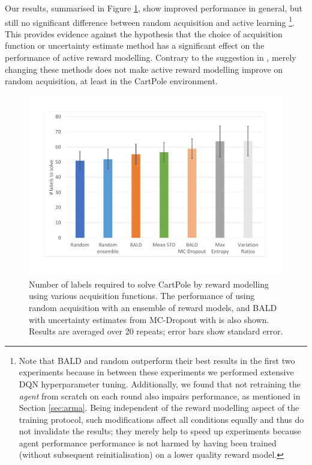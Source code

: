 \documentclass[11pt, a4paper, bibliography=totoc]{report}
\begin{document}
Our results, summarised in Figure \ref{fig:cartpole_final}, show improved performance in general, but still no significant difference between random acquisition and active learning
\footnote{Note that BALD and random outperform their best results in the first two experiments because in between these experiments we performed extensive DQN hyperparameter tuning. Additionally, we found that not retraining the \textit{agent} from scratch on each round also impairs performance, as mentioned in Section \ref{sec:arma}. Being independent of the reward modelling aspect of the training protocol, such modifications affect all conditions equally and thus do not invalidate the results; they merely help to speed up experiments because agent performance performance is not harmed by having been trained (without subsequent reinitialisation) on a lower quality reward model.}.
This provides evidence against the hypothesis that the choice of acquisition function or uncertainty estimate method has a significant effect on the performance of active reward modelling. Contrary to the suggestion in \cite[p.~6]{Christiano2017}, merely changing these methods does not make active reward modelling improve on random acquisition, at least in the CartPole environment.

\begin{figure}[h]
	\centering
	\includegraphics[width=\textwidth]{cartpole_final}
	\caption{Number of labels required to solve CartPole by reward modelling using various acquisition functions. The performance of using random acquisition with an ensemble of reward models, and BALD with uncertainty estimates from MC-Dropout with is also shown. Results are averaged over 20 repeats; error bars show standard error.}
	\label{fig:cartpole_final}
\end{figure}
\end{document}
